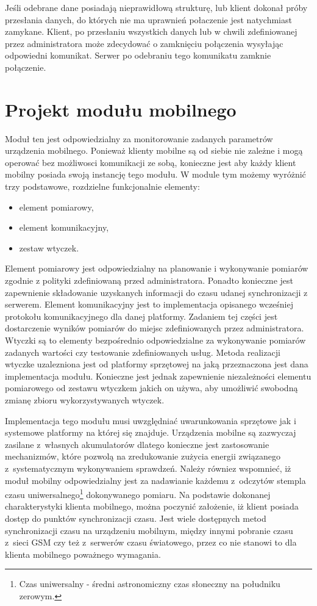 Jeśli odebrane dane posiadają nieprawidłową strukturę, lub klient
dokonał próby przesłania danych, do których nie ma uprawnień
połaczenie jest natychmiast zamykane. Klient, po przesłaniu wszystkich
danych lub w chwili zdefiniowanej przez administratora może zdecydować
o zamknięciu połączenia wysyłając odpowiedni komunikat. Serwer po
odebraniu tego komunikatu zamknie połączenie.


\section[Projekt modułu mobilnego][Projekt modułu mobilnego]{Projekt modułu mobilnego}

Moduł ten jest odpowiedzialny za monitorowanie zadanych parametrów
urządzenia mobilnego. Ponieważ klienty mobilne są od siebie nie
zależne i mogą operować bez możliwosci komunikacji ze sobą, konieczne
jest aby każdy klient mobilny posiada swoją instancję tego modułu. W
module tym możemy wyróżnić trzy podstawowe, rozdzielne funkcjonalnie
elementy:

\begin{itemize}
\item element pomiarowy,
\item element komunikacyjny,
\item zestaw wtyczek.
\end{itemize}

Element pomiarowy jest odpowiedzialny na planowanie i wykonywanie
pomiarów zgodnie z polityki zdefiniowaną przed administratora. Ponadto
konieczne jest zapewnienie składowanie uzyskanych informacji do czasu
udanej synchronizacji z serwerem. Element komunikacyjny jest to
implementacja opisanego wcześniej protokołu komunikacyjnego dla danej
platformy. Zadaniem tej części jest dostarczenie wyników pomiarów do
miejsc zdefiniowanych przez administratora. Wtyczki są to elementy
bezpośrednio odpowiedzialne za wykonywanie pomiarów zadanych wartości
czy testowanie zdefiniowanych usług. Metoda realizacji wtyczke
uzalezniona jest od platformy sprzętowej na jaką przeznaczona jest
dana implementacja modułu. Konieczne jest jednak zapewnienie
niezależności elementu pomiarowego od zestawu wtyczkem jakich on
używa, aby umożliwić swobodną zmianę zbioru wykorzystywanych wtyczek.

Implementacja tego modułu musi uwzględniać uwarunkowania sprzętowe jak
i systemowe platformy na której się znajduje. Urządzenia mobilne są
zazwyczaj zasilane z~własnych akumulatorów dlatego konieczne jest
zastosowanie mechanizmów, które pozwolą na zredukowanie zużycia
energii związanego z~systematycznym wykonywaniem sprawdzeń. Należy
równiez wspomnieć, iż moduł mobilny odpowiedzialny jest za nadawianie
każdemu z~odczytów stempla czasu uniwersalnego\footnote{Czas
  uniwersalny - średni astronomiczny czas słoneczny na południku
  zerowym.} dokonywanego pomiaru. Na podstawie dokonanej
charakterystyki klienta mobilnego, można poczynić założenie, iż klient
posiada dostęp do punktów synchronizacji czasu. Jest wiele dostępnych
metod synchronizacji czasu na urządzeniu mobilnym, między innymi
pobranie czasu z~sieci GSM czy też z~serwerów czasu światowego, przez
co nie stanowi to dla klienta mobilnego poważnego wymagania. 

